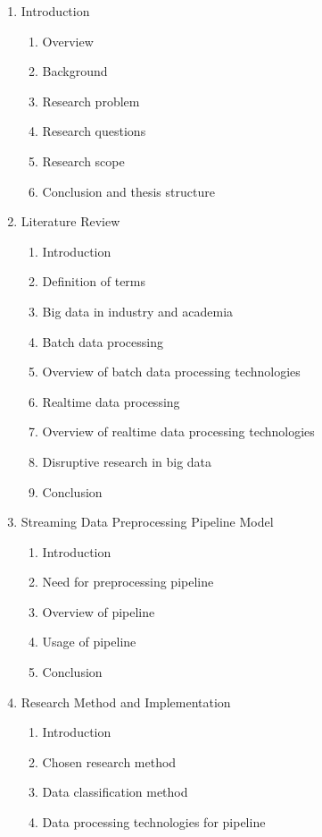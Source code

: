 \documentclass[a4paper,11pt]{article}
\begin{document}
\begin{enumerate}
  \item Introduction
  \begin{enumerate}[label*=\arabic*.]
    \item Overview
    \item Background
    \item Research problem
    \item Research questions
    \item Research scope
    \item Conclusion and thesis structure
  \end{enumerate}
  \item Literature Review
  \begin{enumerate}[label*=\arabic*.]
    \item Introduction
    \item Definition of terms
    \item Big data in industry and academia
    \item Batch data processing
    \item Overview of batch data processing technologies
    \item Realtime data processing
    \item Overview of realtime data processing technologies
    \item Disruptive research in big data
    \item Conclusion
  \end{enumerate}
  \item Streaming Data Preprocessing Pipeline Model
  \begin{enumerate}[label*=\arabic*.]
    \item Introduction
    \item Need for preprocessing pipeline
    \item Overview of pipeline
    \item Usage of pipeline
    \item Conclusion
  \end{enumerate}
  \item Research Method and Implementation
  \begin{enumerate}[label*=\arabic*.]
    \item Introduction
    \item Chosen research method
    \item Data classification method
    \item Data processing technologies for pipeline

\end{enumerate}
\end{enumerate}
\end{document}
